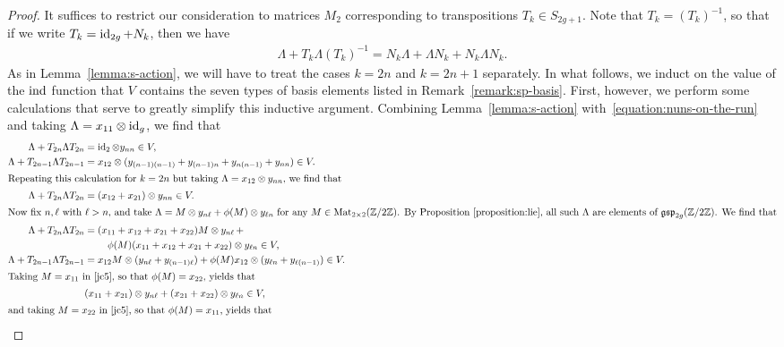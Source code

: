 \begin{proof}
	It suffices to restrict our consideration to matrices $M_2$ corresponding to transpositions $T_k \in S_{2g+1}$. Note that $T_k = (T_k)^{-1}$, so that if we write $T_k = \operatorname{id}_{2g} + N_k$, then we have
    \begin{align} \label{equation:nuns-on-the-run}		
	\Lambda + T_k\Lambda(T_k)^{-1} = N_k\Lambda + \Lambda N_k + N_k \Lambda N_k.
	\end{align}	
	As in Lemma~\ref{lemma:s-action}, we will have to treat the cases $k = 2n$ and $k = 2n+1$ separately. In what follows, we induct on the value of the $\operatorname{ind}$ function that $V$ contains the seven types of basis elements listed in Remark~\ref{remark:sp-basis}.
   First, however, we perform some calculations that serve to greatly simplify this inductive argument. Combining Lemma~\ref{lemma:s-action} with~\eqref{equation:nuns-on-the-run} and taking $\Lambda = x_{11} \otimes \operatorname{id}_g$, we find that 
\begin{align}
\Lambda + T_{2n} \Lambda T_{2n} & = \id_2 \otimes y_{nn} \in V, \label{jc1}\\
\Lambda + T_{2n-1} \Lambda T_{2n-1} & = x_{12} \otimes (y_{(n-1)(n-1)} + y_{(n-1)n} + y_{n(n-1)} + y_{nn}) \in V. \label{jc2} \\
\intertext{Repeating this calculation for $k = 2n$ but taking $\Lambda = x_{12} \otimes y_{nn}$, we find that}
	\Lambda + T_{2n} \Lambda T_{2n} & = (x_{12} + x_{21}) \otimes y_{nn} \in V. \label{jc9} \\
\intertext{Now fix $n, \ell$ with $\ell > n$, and take $\Lambda = M \otimes y_{n\ell} + \phi(M) \otimes y_{\ell n}$ for any $M \in \on{Mat}_{2 \times 2}(\bz / 2 \bz)$. By Proposition~\ref{proposition:lie}, all such $\Lambda$ are elements of $\mf{gsp}_{2g}(\bz/2\bz)$. We find that}
\Lambda + T_{2n} \Lambda T_{2n} & = (x_{11} + x_{12} + x_{21} + x_{22})M \otimes y_{n\ell} \, +  \label{jc5}\\
& \hphantom{===} \phi(M)(x_{11} + x_{12} + x_{21} + x_{22}) \otimes y_{\ell n} \in V, \nonumber \\ 
\Lambda + T_{2n-1}\Lambda T_{2n-1} & = x_{12}M \otimes (y_{n \ell} + y_{(n-1)\ell}) + \phi(M) x_{12} \otimes (y_{\ell n} + y_{\ell (n-1)}) \in V \label{jc3}. \\
\intertext{Taking $M = x_{11}$ in~\eqref{jc5}, so that $\phi(M) = x_{22}$, yields that}
	& (x_{11} + x_{21}) \otimes y_{n \ell} + (x_{21} + x_{22}) \otimes y_{\ell n} \in V, \label{jc6} \\
    \intertext{and taking $M = x_{22}$ in~\eqref{jc5}, so that $\phi(M) = x_{11}$, yields that}

\end{align}
\end{proof}
